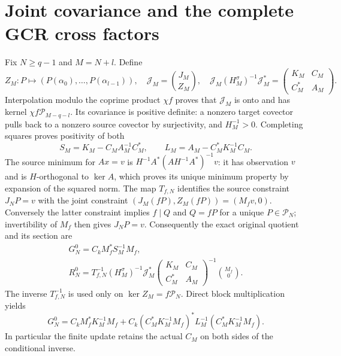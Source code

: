 \documentclass[11pt,a4paper]{article}
\newcommand{\C}{\mathbb C}
\newcommand{\Pp}{\mathcal P}
\begin{document}
\section{Joint covariance and the complete GCR cross factors}

Fix $N\geq q-1$ and $M=N+l$. Define
\[
 Z_M:P\mapsto(P(\alpha_0),\ldots,P(\alpha_{l-1})),\quad
 \mathscr J_M=\binom{J_M}{Z_M},\quad
 \mathscr J_M(H_M^\sigma)^{-1}\mathscr J_M^*
   =\begin{pmatrix}K_M&C_M\\C_M^*&A_M\end{pmatrix}.
\tag{JSA12}
\]
Interpolation modulo the coprime product $\chi f$ proves that
$\mathscr J_M$ is onto and has kernel $\chi f\Pp_{M-q-l}$.
Its covariance is positive definite: a nonzero target covector
pulls back to a nonzero source covector by surjectivity, and
$H_M^{-1}>0$. Completing squares proves positivity of both
\[
 S_M=K_M-C_MA_M^{-1}C_M^*,\qquad
 L_M=A_M-C_M^*K_M^{-1}C_M.
\tag{JSA13}
\]
The source minimum for $Ax=v$ is
$H^{-1}A^*(AH^{-1}A^*)^{-1}v$: it has observation $v$ and is
$H$-orthogonal to $\ker A$, which proves its unique minimum
property by expansion of the squared norm. The map $T_{f,N}$
identifies the source constraint $J_NP=v$ with the joint
constraint $(J_M(fP),Z_M(fP))=(M_fv,0)$. Conversely the latter
constraint implies $f\mid Q$ and $Q=fP$ for a unique
$P\in\Pp_N$; invertibility of $M_f$ then gives $J_NP=v$.
Consequently the exact original quotient and its section are
\[
\begin{gathered}
 G_N^0=C_k M_f^*S_M^{-1}M_f,\\
 R_N^0=T_{f,N}^{-1}(H_M^\sigma)^{-1}\mathscr J_M^*
   \begin{pmatrix}K_M&C_M\\C_M^*&A_M\end{pmatrix}^{-1}
   \binom{M_f}{0}.
\end{gathered}\tag{JSA14}
\]
The inverse $T_{f,N}^{-1}$ is used only on $\ker Z_M=f\Pp_N$.
Direct block multiplication yields
\[
 G_N^0=C_kM_f^*K_M^{-1}M_f
       +C_k(C_M^*K_M^{-1}M_f)^*L_M^{-1}
                    (C_M^*K_M^{-1}M_f).
\tag{JSA15}
\]
In particular the finite update retains the actual $C_M$ on
both sides of the conditional inverse.
\end{document}

